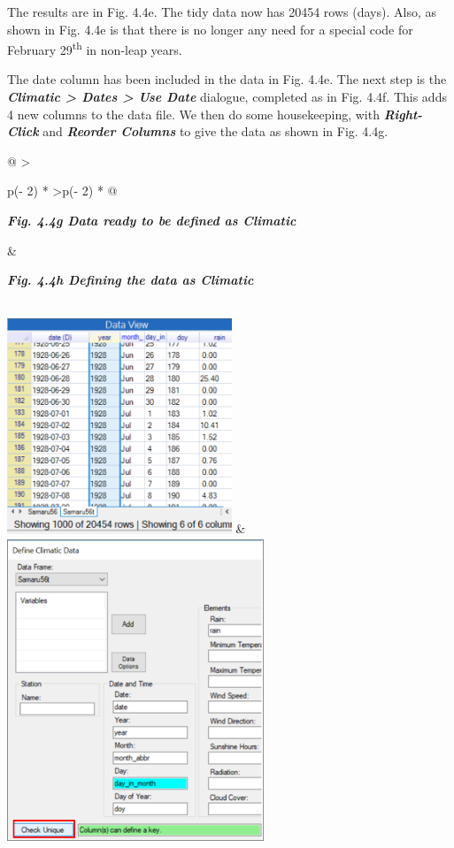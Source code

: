\documentclass[
  letterpaper,
  DIV=11,
  numbers=noendperiod]{scrreprt}
\begin{document}
The results are in Fig. 4.4e. The tidy data now has 20454 rows (days).
Also, as shown in Fig. 4.4e is that there is no longer any need for a
special code for February 29\textsuperscript{th} in non-leap years.

The date column has been included in the data in Fig. 4.4e. The next
step is the \textbf{\emph{Climatic \textgreater{} Dates \textgreater{}
Use Date}} dialogue, completed as in Fig. 4.4f. This adds 4 new columns
to the data file. We then do some housekeeping, with
\textbf{\emph{Right-Click}} and \textbf{\emph{Reorder Columns}} to give
the data as shown in Fig. 4.4g.

\begin{longtable}[]{@{}
  >{\raggedright\arraybackslash}p{(\columnwidth - 2\tabcolsep) * }
  >{\centering\arraybackslash}p{(\columnwidth - 2\tabcolsep) * }@{}}
\toprule\noalign{}
\begin{minipage}[b]{\linewidth}\raggedright
\textbf{\emph{Fig. 4.4g Data ready to be defined as Climatic}}
\end{minipage} & \begin{minipage}[b]{\linewidth}\centering
\textbf{\emph{Fig. 4.4h Defining the data as Climatic}}
\end{minipage} \\
\midrule\noalign{}
\endhead
\bottomrule\noalign{}
\endlastfoot
\includegraphics[width=2.64161in,height=\textheight]{figures/Fig4.4g.png}
&
\includegraphics[width=3.01996in,height=3.58434in]{figures/Fig4.4h.png} \\
\end{longtable}
\end{document}
